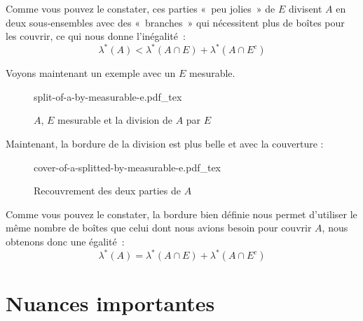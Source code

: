 \documentclass[a4paper]{article}
\newcommand{\incfig}[1]{%
    \def\svgwidth{\columnwidth}
    {#1.pdf_tex}
}
\begin{document}
Comme vous pouvez le constater, ces parties « peu jolies » de $E$ divisent $A$ en deux sous-ensembles avec des « branches » qui nécessitent plus de boîtes pour les couvrir, ce qui nous donne l'inégalité :
 \[
\lambda^*(A) < \lambda^*(A \cap E) + \lambda^*(A \cap E^c)
\] 

Voyons maintenant un exemple avec un $E$ mesurable.
\begin{figure}[H]
    
    \centering
    \incfig{split-of-a-by-measurable-e}
    \caption{$A$, $E$ mesurable et la division de $A$ par $E$}
    \label{fig:split-of-a-by-measurable-e}
\end{figure}%
Maintenant, la bordure de la division est plus belle et avec la couverture :%
\begin{figure}[H]
    
    
    
    \centering
    \incfig{cover-of-a-splitted-by-measurable-e}
    \caption{Recouvrement des deux parties de $A$}
    \label{fig:cover-of-a-splitted-by-measurable-e}
\end{figure}%


Comme vous pouvez le constater, la bordure bien définie nous permet d'utiliser le même nombre de boîtes que celui dont nous avions besoin pour couvrir $A$, nous obtenons donc une égalité :
 \[
\lambda^*(A) = \lambda^*(A \cap E) + \lambda^*(A \cap E^c)
\] 

\section{Nuances importantes}%
% 
\label{sec:Important nuances}%
\end{document}
